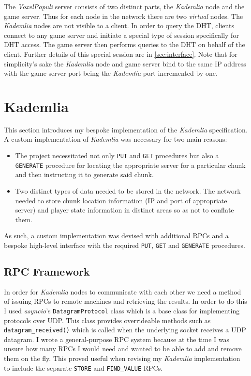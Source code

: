 \documentclass[12pt,notitlepage,a4paper]{report}
\newcommand{\kademlia}{\emph{Kademlia}}
\newcommand{\voxpop}{\emph{VoxelPopuli}}
\begin{document}
	The \voxpop{} server consists of two distinct parts, the \kademlia{} node and the game server. Thus for each node in the network there are two \emph{virtual} nodes. The \kademlia{} nodes are not visible to a client. In order to query the DHT, clients connect to any game server and initiate a special type of session specifically for DHT access. The game server then performs queries to the DHT on behalf of the client. Further details of this special session are in \cref{sec:interface}. Note that for simplicity's sake the \kademlia{} node and game server bind to the same IP address with the game server port being the \kademlia{} port incremented by one.
	
	\section{Kademlia}
	This section introduces my bespoke implementation of the \kademlia{} specification. A custom implementation of \kademlia{} was necessary for two main reasons:
	\begin{itemize}
		\item The project necessitated not only \texttt{PUT} and \texttt{GET} procedures but also a \texttt{GENERATE} procedure for locating the appropriate server for a particular chunk and then instructing it to generate said chunk.
		\item Two distinct types of data needed to be stored in the network. The network needed to store chunk location information (IP and port of appropriate server) and player state information in distinct areas so as not to conflate them.
	\end{itemize}
	As such, a custom implementation was devised with additional RPCs and a bespoke high-level interface with the required \texttt{PUT}, \texttt{GET} and \texttt{GENERATE} procedures.
	
	\subsection{RPC Framework}
	\label{sec:rpcframework}
	In order for \kademlia{} nodes to communicate with each other we need a method of issuing RPCs to remote machines and retrieving the results. In order to do this I used \emph{asyncio}'s \texttt{DatagramProtocol} class which is a base class for implementing protocols over UDP. This class provides overrideable methods such as \texttt{datagram\_received()} which is called when the underlying socket receives a UDP datagram. I wrote a general-purpose RPC system because at the time I was unsure how many RPCs I would need and wanted to be able to add and remove them on the fly. This proved useful when revising my \kademlia{} implementation to include the separate \texttt{STORE} and \texttt{FIND\_VALUE} RPCs.
	
\end{document}
